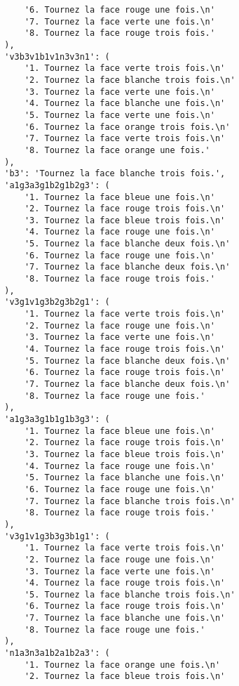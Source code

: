 \begin{lstlisting}
            '6. Tournez la face rouge une fois.\n'
            '7. Tournez la face verte une fois.\n'
            '8. Tournez la face rouge trois fois.'
        ),
        'v3b3v1b1v1n3v3n1': (
            '1. Tournez la face verte trois fois.\n'
            '2. Tournez la face blanche trois fois.\n'
            '3. Tournez la face verte une fois.\n'
            '4. Tournez la face blanche une fois.\n'
            '5. Tournez la face verte une fois.\n'
            '6. Tournez la face orange trois fois.\n'
            '7. Tournez la face verte trois fois.\n'
            '8. Tournez la face orange une fois.'
        ),
        'b3': 'Tournez la face blanche trois fois.',
        'a1g3a3g1b2g1b2g3': (
            '1. Tournez la face bleue une fois.\n'
            '2. Tournez la face rouge trois fois.\n'
            '3. Tournez la face bleue trois fois.\n'
            '4. Tournez la face rouge une fois.\n'
            '5. Tournez la face blanche deux fois.\n'
            '6. Tournez la face rouge une fois.\n'
            '7. Tournez la face blanche deux fois.\n'
            '8. Tournez la face rouge trois fois.'
        ),
        'v3g1v1g3b2g3b2g1': (
            '1. Tournez la face verte trois fois.\n'
            '2. Tournez la face rouge une fois.\n'
            '3. Tournez la face verte une fois.\n'
            '4. Tournez la face rouge trois fois.\n'
            '5. Tournez la face blanche deux fois.\n'
            '6. Tournez la face rouge trois fois.\n'
            '7. Tournez la face blanche deux fois.\n'
            '8. Tournez la face rouge une fois.'
        ),
        'a1g3a3g1b1g1b3g3': (
            '1. Tournez la face bleue une fois.\n'
            '2. Tournez la face rouge trois fois.\n'
            '3. Tournez la face bleue trois fois.\n'
            '4. Tournez la face rouge une fois.\n'
            '5. Tournez la face blanche une fois.\n'
            '6. Tournez la face rouge une fois.\n'
            '7. Tournez la face blanche trois fois.\n'
            '8. Tournez la face rouge trois fois.'
        ),
        'v3g1v1g3b3g3b1g1': (
            '1. Tournez la face verte trois fois.\n'
            '2. Tournez la face rouge une fois.\n'
            '3. Tournez la face verte une fois.\n'
            '4. Tournez la face rouge trois fois.\n'
            '5. Tournez la face blanche trois fois.\n'
            '6. Tournez la face rouge trois fois.\n'
            '7. Tournez la face blanche une fois.\n'
            '8. Tournez la face rouge une fois.'
        ),
        'n1a3n3a1b2a1b2a3': (
            '1. Tournez la face orange une fois.\n'
            '2. Tournez la face bleue trois fois.\n'

\end{lstlisting}
